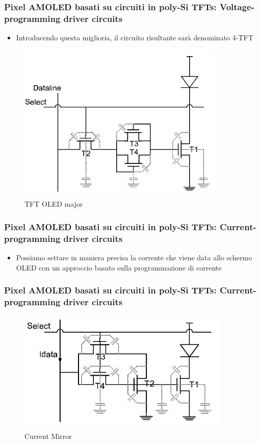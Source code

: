 \documentclass[12pt]{beamer}
\begin{document}
	\begin{frame}
		\frametitle{Pixel AMOLED basati su circuiti in poly-Si TFTs: Voltage-programming driver circuits}
		\begin{itemize}
			\item Introducendo questa miglioria, il circuito risultante sarà denominato 4-TFT
		\end{itemize}
		\begin{figure}
			\centering
			\includegraphics[width=0.7\linewidth]{FISICA/tft_oled_maggiore}
			\caption{TFT OLED major}
			\label{fig:tftoledmaggiore}
		\end{figure}
	\end{frame}
	\begin{frame}
		\frametitle{Pixel AMOLED basati su circuiti in poly-Si TFTs: Current-programming driver circuits}
		\begin{itemize}
			\item Possiamo settare in maniera precisa la corrente che viene data allo schermo OLED con un approccio basato sulla programmazione di corrente
		\end{itemize}
	\end{frame}
	\begin{frame}
		\frametitle{Pixel AMOLED basati su circuiti in poly-Si TFTs: Current-programming driver circuits}
		\begin{figure}
			\centering
			\includegraphics[width=1\linewidth]{FISICA/current_mirror}
			\caption{Current Mirror}
			\label{fig:currentmirror}
		\end{figure}
	\end{frame}
\end{document}
